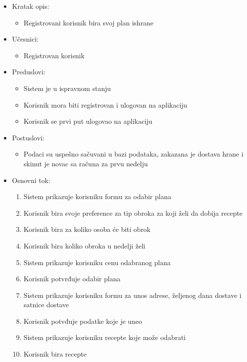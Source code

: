 \begin{itemize}
    \item Kratak opis:
        \begin{itemize}
            \item Registrovani korisnik bira svoj plan ishrane 
        \end{itemize}
    \item Učesnici:
        \begin{itemize}
            \item Registrovan korisnik
        \end{itemize}
    \item Preduslovi:
        \begin{itemize}
            \item Sistem je u ispravnom stanju
            \item Korisnik mora biti registrovan i ulogovan na aplikaciju
            \item Korisnik se prvi put ulogovao na aplikaciju
        \end{itemize}
    \item Postuslovi:
        \begin{itemize}
            \item Podaci su uspešno sačuvani u bazi podataka, zakazana je dostava hrane i skinut je novac sa računa za prvu nedelju
        \end{itemize}
    \item Osnovni tok:
        \begin{enumerate}
            \item Sistem prikazuje korisniku formu za odabir plana
            \item Korisnik bira svoje preference za tip obroka za koji želi da dobija recepte
            \item Korisnik bira za koliko osoba će biti obrok
            \item Korisnik bira koliko obroka u nedelji želi
            \item Sistem prikazuje korisniku cenu odabranog plana
            \item Korisnik potvrđuje odabir plana
            \item Sistem prikazuje korisniku formu za unos adrese, željenog dana dostave i satnice dostave
            \item Korisnik potvđuje podatke koje je uneo
            \item Sistem prikazuje korisniku recepte koje može odabrati
            \item Korisnik bira recepte

\end{enumerate}
\end{itemize}
